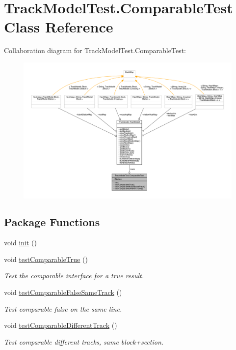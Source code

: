 \hypertarget{classTrackModelTest_1_1ComparableTest}{}\section{Track\+Model\+Test.\+Comparable\+Test Class Reference}
\label{classTrackModelTest_1_1ComparableTest}


Collaboration diagram for Track\+Model\+Test.\+Comparable\+Test\+:
\nopagebreak
\begin{figure}[H]
\begin{center}
\leavevmode
\includegraphics[width=350pt]{classTrackModelTest_1_1ComparableTest__coll__graph}
\end{center}
\end{figure}
\subsection*{Package Functions}
\begin{DoxyCompactItemize}
\item 
void \hyperlink{classTrackModelTest_1_1ComparableTest_a9f72a396557a4cf1b44c6186e123c1ac}{init} ()
\item 
void \hyperlink{classTrackModelTest_1_1ComparableTest_a907cb87775faa275c564a5dea19d7045}{test\+Comparable\+True} ()
\begin{DoxyCompactList}\small\item\em Test the comparable interface for a true result. \end{DoxyCompactList}\item 
void \hyperlink{classTrackModelTest_1_1ComparableTest_add7c697d3a7cfbaa93212cfc657b3d22}{test\+Comparable\+False\+Same\+Track} ()
\begin{DoxyCompactList}\small\item\em Test comparable false on the same line. \end{DoxyCompactList}\item 
void \hyperlink{classTrackModelTest_1_1ComparableTest_af0a95c84e6f6a63d42e110e6987e9b76}{test\+Comparable\+Different\+Track} ()
\begin{DoxyCompactList}\small\item\em Test comparable different tracks, same block+section. \end{DoxyCompactList}\end{DoxyCompactItemize}
